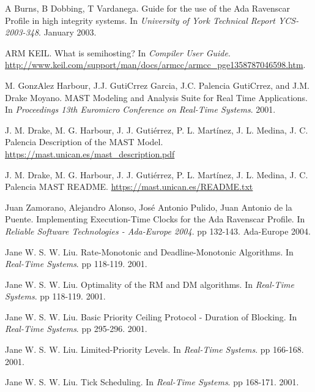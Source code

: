 \documentclass{article}
\begin{document}
\begin{thebibliography}{1}

A Burns, B Dobbing, T Vardanega.
\newblock Guide for the use of the Ada Ravenscar Profile in high integrity systems.
\newblock In {\em University of York Technical Report YCS-2003-348}. January 2003.

ARM KEIL.
\newblock What is semihosting?
\newblock In {\em Compiler User Guide}. \url{http://www.keil.com/support/man/docs/armcc/armcc_pge1358787046598.htm}.

M. GonzAlez Harbour, J.J. GutiCrrez Garcia, J.C. Palencia GutiCrrez, and J.M. Drake Moyano.
\newblock MAST Modeling and Analysis Suite for Real Time Applications.
\newblock In {\em Proceedings 13th Euromicro Conference on Real-Time Systems}. 2001.

J. M. Drake, M. G. Harbour, J. J. Gutiérrez, P. L. Martínez, J. L. Medina, J. C. Palencia
\newblock Description of the MAST Model.
\newblock \url{https://mast.unican.es/mast_description.pdf}

J. M. Drake, M. G. Harbour, J. J. Gutiérrez, P. L. Martínez, J. L. Medina, J. C. Palencia
\newblock MAST README.
\newblock \url{https://mast.unican.es/README.txt}

Juan Zamorano, Alejandro Alonso, José Antonio Pulido, Juan Antonio de la Puente.
\newblock Implementing Execution-Time Clocks for the Ada Ravenscar Profile.
\newblock In {\em Reliable Software Technologies - Ada-Europe 2004}. pp 132-143. Ada-Europe 2004.

Jane W. S. W. Liu.
\newblock Rate-Monotonic and Deadline-Monotonic Algorithms.
\newblock In {\em Real-Time Systems}. pp 118-119. 2001.

Jane W. S. W. Liu.
\newblock Optimality of the RM and DM algorithms.
\newblock In {\em Real-Time Systems}. pp 118-119. 2001.

Jane W. S. W. Liu.
\newblock Basic Priority Ceiling Protocol - Duration of Blocking.
\newblock In {\em Real-Time Systems}. pp 295-296. 2001.

Jane W. S. W. Liu.
\newblock Limited-Priority Levels.
\newblock In {\em Real-Time Systems}. pp 166-168. 2001.

Jane W. S. W. Liu.
\newblock Tick Scheduling.
\newblock In {\em Real-Time Systems}. pp 168-171. 2001.


\end{thebibliography}
\end{document}
